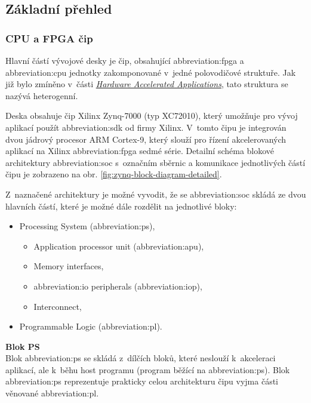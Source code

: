 \documentclass[a4paper, twoside, 11pt]{article}
\begin{document}
		\subsection{Základní přehled}
		\subsubsection{CPU a FPGA čip}
			Hlavní částí vývojové desky je čip, obsahující \gls{abbreviation:fpga} a \gls{abbreviation:cpu} jednotky zakomponované v~jedné polovodičové struktuře. Jak již bylo zmíněno v~části \hyperref[subsec:hardware-accelerated-applications]{\textit{Hardware Accelerated Applications}}, tato struktura se nazývá heterogenní.\par
			Deska obsahuje čip Xilinx Zynq-7000 (typ XC72010), který umožňuje pro vývoj aplikací použít \gls{abbreviation:sdk} od firmy Xilinx. V~tomto čipu je integrován dvou jádrový procesor ARM Cortex-9, který slouží pro řízení akcelerovaných aplikací na Xilinx \gls{abbreviation:fpga} sedmé série. Detailní schéma blokové architektury \gls{abbreviation:soc} s~označním sběrnic a komunikace jednotlivých částí čipu je zobrazeno na obr. \ref{fig:zynq-block-diagram-detailed}.\par
			Z~naznačené architektury je možné vyvodit, že se \gls{abbreviation:soc} skládá ze dvou hlavních částí, které je možné dále rozdělit na jednotlivé bloky:
			\begin{itemize}
				\item Processing System (\gls{abbreviation:ps}),
				\begin{itemize}
					\item Application processor unit (\gls{abbreviation:apu}),
					\item Memory interfaces,
					\item \gls{abbreviation:io} peripherals (\gls{abbreviation:iop}),
					\item Interconnect,
				\end{itemize}
				\item Programmable Logic (\gls{abbreviation:pl}).
			\end{itemize}
			\vspace*{0.25cm}
			\noindent\textbf{Blok PS}\\
			Blok \gls{abbreviation:ps} se skládá z~dílčích bloků, které neslouží k~akceleraci aplikací, ale k~běhu host programu (program běžící na \gls{abbreviation:ps}). Blok \gls{abbreviation:ps} reprezentuje prakticky celou architekturu čipu vyjma části věnované \gls{abbreviation:pl}.\par\vspace*{0.25cm}
\end{document}
